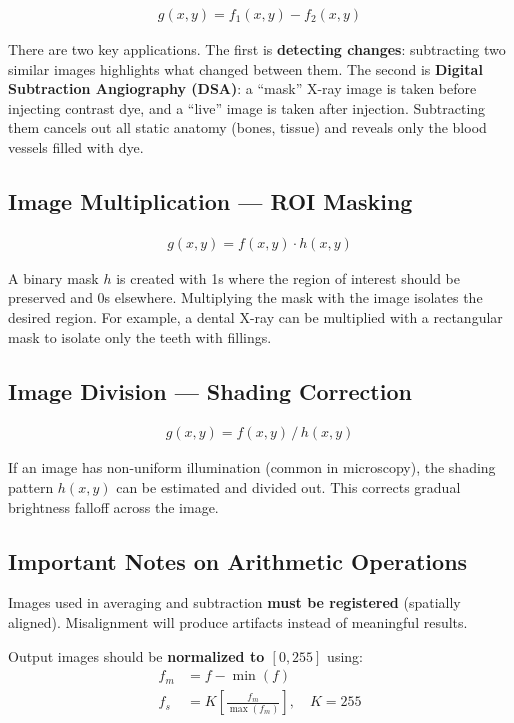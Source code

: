 \documentclass[11pt]{article}
\begin{document}
\begin{align}
    g(x,y) = f_1(x,y) - f_2(x,y)
\end{align}

There are two key applications. The first is \textbf{detecting changes}: subtracting two similar images highlights what changed between them. The second is \textbf{Digital Subtraction Angiography (DSA)}: a ``mask'' X-ray image is taken before injecting contrast dye, and a ``live'' image is taken after injection. Subtracting them cancels out all static anatomy (bones, tissue) and reveals only the blood vessels filled with dye.

\subsection{Image Multiplication --- ROI Masking}

\begin{align}
    g(x,y) = f(x,y) \cdot h(x,y)
\end{align}

A binary mask $h$ is created with 1s where the region of interest should be preserved and 0s elsewhere. Multiplying the mask with the image isolates the desired region. For example, a dental X-ray can be multiplied with a rectangular mask to isolate only the teeth with fillings.

\subsection{Image Division --- Shading Correction}

\begin{align}
    g(x,y) = f(x,y) \,/\, h(x,y)
\end{align}

If an image has non-uniform illumination (common in microscopy), the shading pattern $h(x,y)$ can be estimated and divided out. This corrects gradual brightness falloff across the image.

\subsection{Important Notes on Arithmetic Operations}

Images used in averaging and subtraction \textbf{must be registered} (spatially aligned). Misalignment will produce artifacts instead of meaningful results.

Output images should be \textbf{normalized to $[0, 255]$} using:
\begin{align}
    f_m &= f - \min(f) \\
    f_s &= K\left[\frac{f_m}{\max(f_m)}\right], \quad K = 255
\end{align}
\end{document}

